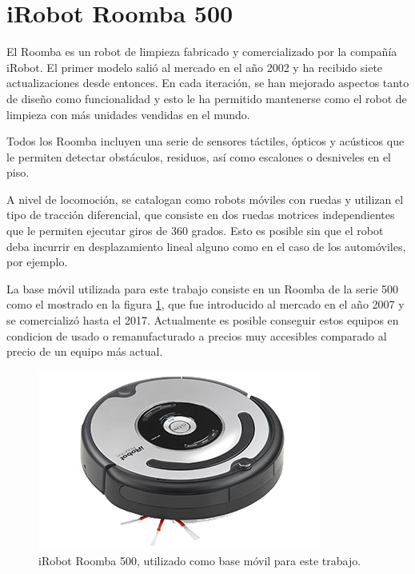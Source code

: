 \section{iRobot Roomba 500}\label{sec:roomba}

El Roomba es un robot de limpieza fabricado y comercializado por la compañía iRobot. El primer modelo salió al mercado en el año 2002 y ha recibido siete actualizaciones desde entonces. En cada iteración, se han mejorado aspectos tanto de diseño como funcionalidad y esto le ha permitido mantenerse como el robot de limpieza con más unidades vendidas en el mundo.

Todos los Roomba incluyen una serie de sensores táctiles, ópticos y acústicos que le permiten detectar obstáculos, residuos, así como escalones o desniveles en el piso.

A nivel de locomoción, se catalogan como robots móviles con ruedas y utilizan el tipo de tracción diferencial, que consiste en dos ruedas motrices independientes que le permiten ejecutar giros de 360 grados. Esto es posible sin que el robot deba incurrir en desplazamiento lineal alguno como en el caso de los automóviles, por ejemplo.

La base móvil utilizada para este trabajo consiste en un Roomba de la serie 500 como el mostrado en la figura \ref{fig:roomba}, que fue introducido al mercado en el año 2007 y se comercializó hasta el 2017. Actualmente es posible conseguir estos equipos en condicion de usado o remanufacturado a precios muy accesibles comparado al precio de un equipo más actual.

\begin{figure}[ht]
    \centering
    \includegraphics[scale=2.5]{./Figures/roomba.png}
    \caption{iRobot Roomba 500, utilizado como base móvil para este trabajo.\protect\footnotemark}
    \label{fig:roomba}
\end{figure}


